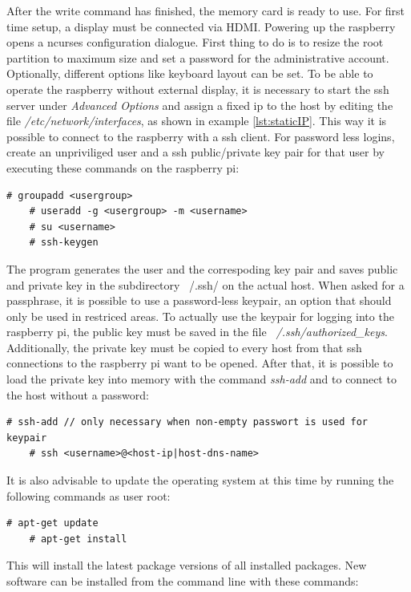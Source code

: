 After the write command has finished, the memory card is ready to use. For first time setup, a display must be connected via HDMI. Powering up the raspberry
opens a ncurses configuration dialogue. First thing to do is to resize the root partition to maximum size and set a password for the administrative
account. Optionally, different options like keyboard layout can be set.
To be able to operate the raspberry without external display, it is necessary to start the ssh server under \textit{Advanced Options} and assign a 
fixed ip to the host by editing the file \textit{/etc/network/interfaces}, as shown in example \ref{lst:staticIP}. This way it is possible to connect to the raspberry with a ssh client. For password less logins, create an unpriviliged user and
 a ssh public/private key pair for that user by executing these commands on the raspberry pi:

\begin{lstlisting}[style=BashInputStyle]
    # groupadd <usergroup>
    # useradd -g <usergroup> -m <username>
    # su <username>
    # ssh-keygen
\end{lstlisting}
 
The program generates the user and the correspoding key pair and saves public and private key in the subdirectory ~/.ssh/ on the actual host. When asked for a passphrase, it is possible
to use a password-less keypair, an option that should only be used in restriced areas.
To actually use the keypair for logging into
the raspberry pi, the public key must be saved in the file \textit{~/.ssh/authorized\_keys}. Additionally, the private key must be copied to every host
from that ssh connections to the raspberry pi want to be opened. After that, it is possible to load the private key into memory with the command \textit{ssh-add}
and to connect to the host without a password:

\begin{lstlisting}[style=BashInputStyle]
    # ssh-add // only necessary when non-empty passwort is used for keypair
    # ssh <username>@<host-ip|host-dns-name>
\end{lstlisting}

It is also advisable to update the operating system at this time by running the following commands as user root:

\begin{lstlisting}[style=BashInputStyle]
    # apt-get update
    # apt-get install
\end{lstlisting}

This will install the latest package versions of all installed packages. New software can be installed from the command line with these commands:

